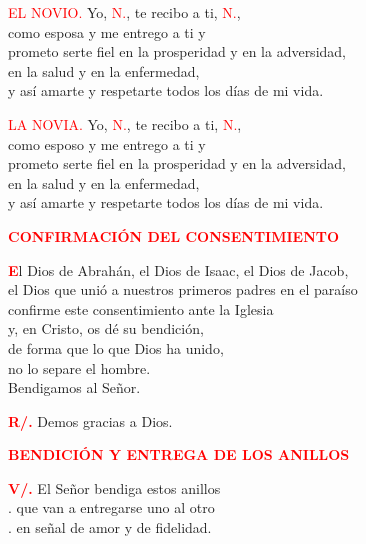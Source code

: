 \documentclass[12pt, letterpaper]{report}
\begin{document}


\textcolor{red}{EL NOVIO.} \newline
Yo, \textcolor{red}{N.}, te recibo a ti, \textcolor{red}{N.}, \\
como esposa y me entrego a ti y \\
prometo serte fiel en la prosperidad y en la adversidad, \\
en la salud y en la enfermedad, \\
y as\'i amarte y respetarte todos los d\'ias de mi vida. \newline

\textcolor{red}{LA NOVIA.} \newline
Yo, \textcolor{red}{N.}, te recibo a ti, \textcolor{red}{N.}, \\
como esposo y me entrego a ti y \\
prometo serte fiel en la prosperidad y en la adversidad, \\
en la salud y en la enfermedad, \\
y as\'i amarte y respetarte todos los d\'ias de mi vida. \newline

\newpage

\Large {\bfseries \textcolor{red}{CONFIRMACI\'ON DEL CONSENTIMIENTO}}

\lettrine[lines=1]{\bfseries \textcolor{red}{E}}{}\Large l Dios de Abrah\'an, el Dios de Isaac, el Dios de Jacob, \\
el Dios que uni\'o a nuestros primeros padres en el para\'iso \\
confirme este consentimiento ante la Iglesia \\
y, en Cristo, os d\'e su bendici\'on, \\
de forma que lo que Dios ha unido, \\
no lo separe el hombre.\\
Bendigamos al Se\~nor. \newline

\Large \hspace{-0.9cm} {\bfseries \textcolor{red}{R/.}} \hspace{0.5cm} Demos gracias a Dios. \newline

\Large {\bfseries \textcolor{red}{BENDICI\'ON Y ENTREGA DE LOS ANILLOS}} \newline

\Large \hspace{-0.9cm} {\bfseries \textcolor{red}{V/.}} \hspace{0.5cm} El Se\~nor bendiga \Huge \textcolor{red}{} \Large estos anillos \\
. \hspace{1cm} que van a entregarse uno al otro \\
. \hspace{1cm} en se\~nal de amor y de fidelidad. \newline
\end{document}
